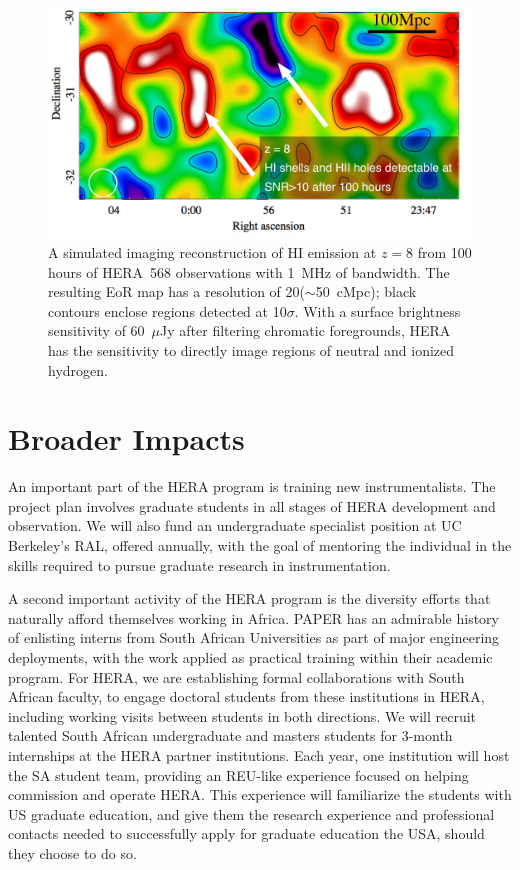 \documentclass[preprint]{aastex}
\def\HI{{H{\small I }}}
\begin{document}
\begin{figure}[t] \centering
\includegraphics[height=2.4in]{plots/HERA_z8_SNR_wide_annotated.jpg}
\caption{\small 
A simulated imaging reconstruction of \HI emission at $z=8$ from 
100 hours of HERA~568 observations with 1~MHz of bandwidth.  The resulting
EoR map has a resolution of 20\arcmin ($\sim$50~cMpc); black contours
enclose regions detected at 10$\sigma$.
With a surface brightness sensitivity of 60~$\mu$Jy after filtering chromatic
foregrounds, HERA has the sensitivity
to directly image regions of neutral and ionized hydrogen.
\label{imaging}}
\end{figure}

\vspace{-0.25in}
\section{Broader Impacts}
\label{BIsec}

An important part of the HERA program is training new
instrumentalists.  The project plan involves graduate students in all
stages of HERA development and observation. We will also fund an
undergraduate specialist position
at UC Berkeley's RAL, offered annually, with the goal of
mentoring the individual in the skills required to pursue graduate
research in instrumentation.

A second important activity of the HERA program is the diversity
efforts that naturally afford themselves working in Africa. PAPER has
an admirable history of enlisting interns from South African
Universities as part of major engineering deployments, with the work
applied as practical training within their academic program.
For HERA, we are establishing formal collaborations with South African
faculty, to engage doctoral students from these institutions in HERA,
including working visits between students in both directions. We will
recruit talented South African undergraduate and masters students for
3-month internships at the HERA partner institutions. Each year, one
institution will host the SA student team, providing an REU-like
experience focused on helping commission and operate HERA. This
experience will familiarize the students with US graduate education,
and give them the research experience and professional contacts needed
to successfully apply for graduate education the USA, should they
choose to do so.
\end{document}
